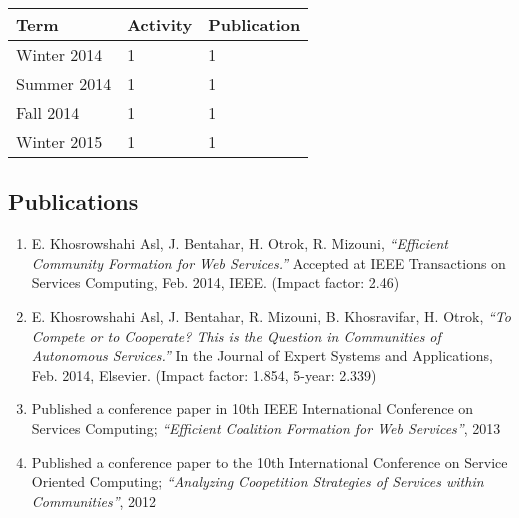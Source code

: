 \begin{center}
    \begin{tabular}{ | l | l | p{5cm} |}
    \hline
    Term & Activity & Publication \\ \hline
    Winter 2014 & 1 & 1 \\ \hline
    Summer 2014 & 1 & 1 \\ \hline
    Fall 2014 & 1 & 1 \\ \hline
    Winter 2015 & 1 & 1 \\
    \hline
    \end{tabular}
\end{center}


\subsection {Publications }

    \begin{enumerate}
        \item E. Khosrowshahi Asl, J. Bentahar, H. Otrok, R. Mizouni, \emph{``Efficient Community Formation for Web Services.''} Accepted at IEEE Transactions on Services Computing, Feb. 2014, IEEE. (Impact factor: 2.46)
        \item E. Khosrowshahi Asl, J. Bentahar, R. Mizouni, B. Khosravifar, H. Otrok, \emph{``To Compete or to Cooperate? This is the Question in Communities of Autonomous Services.''} In the Journal of Expert Systems and Applications, Feb. 2014, Elsevier. (Impact factor: 1.854, 5-year:  2.339)
        \item Published a conference paper in 10th IEEE International Conference on Services Computing; \emph{``Efficient Coalition Formation for Web Services''}, 2013
        \item Published a conference paper to the 10th International Conference on Service Oriented Computing; \emph{``Analyzing Coopetition Strategies of Services within Communities''}, 2012
    \end{enumerate}

